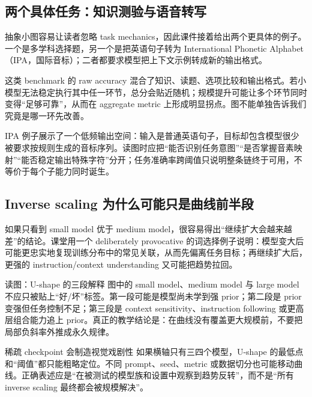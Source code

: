 \subsection{两个具体任务：知识测验与语音转写}

抽象小图容易让读者忽略 task mechanics，因此课件接着给出两个更具体的例子。一个是多学科选择题，另一个是把英语句子转为 International Phonetic Alphabet（IPA，国际音标）；二者都要求模型把上下文示例转成新的输出格式。


这类 benchmark 的 raw accuracy 混合了知识、读题、选项比较和输出格式。若小模型无法稳定执行其中任一环节，总分会贴近随机；规模提升可能让多个环节同时变得“足够可靠”，从而在 aggregate metric 上形成明显拐点。图不能单独告诉我们究竟是哪一环先改善。


IPA 例子展示了一个低频输出空间：输入是普通英语句子，目标却包含模型很少被要求按规则生成的音标序列。读图时应把“能否识别任务意图”“是否掌握音素映射”“能否稳定输出特殊字符”分开；任务准确率跨阈值只说明整条链终于可用，不等价于每个子能力同时诞生。

\subsection{Inverse scaling 为什么可能只是曲线前半段}

如果只看到 small model 优于 medium model，很容易得出“继续扩大会越来越差”的结论。课堂用一个 deliberately provocative 的词选择例子说明：模型变大后可能更忠实地复现训练分布中的常见关联，从而先偏离任务目标；再继续扩大后，更强的 instruction/context understanding 又可能把趋势拉回。


\begin{knowledgebox}{读图：U-shape 的三段解释}
图中的 small model、medium model 与 large model 不应只被贴上“好/坏”标签。第一段可能是模型尚未学到强 prior；第二段是 prior 变强但任务控制不足；第三段是 context sensitivity、instruction following 或更高层组合能力追上 prior。真正的教学结论是：在曲线没有覆盖更大规模前，不要把局部负斜率外推成永久规律。
\end{knowledgebox}

\begin{warningbox}{稀疏 checkpoint 会制造视觉戏剧性}
如果横轴只有三四个模型，U-shape 的最低点和“阈值”都只能粗略定位。不同 prompt、seed、metric 或数据切分也可能移动曲线。正确表述应是“在被测试的模型族和设置中观察到趋势反转”，而不是“所有 inverse scaling 最终都会被规模解决”。
\end{warningbox}

